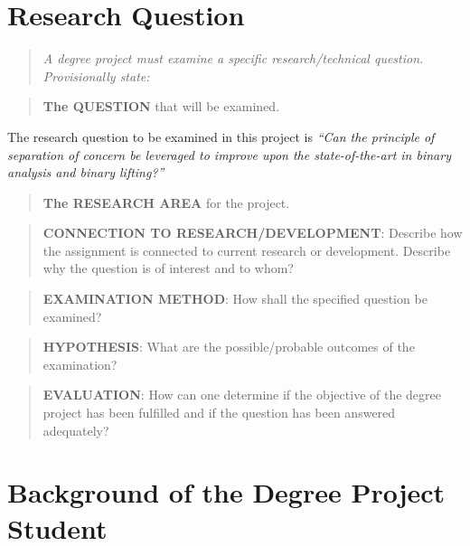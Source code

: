 \documentclass[12pt, a4paper]{article}
\begin{document}
\section{Research Question}

\begin{quote}
	\textit{A degree project must examine a specific research/technical question. Provisionally state:}
\end{quote}

\begin{quote}
	\textbf{The QUESTION} that will be examined.
\end{quote}

The research question to be examined in this project is \textit{``Can the principle of separation of concern be leveraged to improve upon the state-of-the-art in binary analysis and binary lifting?''}

\begin{quote}
	\textbf{The RESEARCH AREA} for the project.
\end{quote}


\begin{quote}
	\textbf{CONNECTION TO RESEARCH/DEVELOPMENT}: Describe how the assignment is connected to current research or development. Describe why the question is of interest and to whom?
\end{quote}


\begin{quote}
	\textbf{EXAMINATION METHOD}: How shall the specified question be examined?
\end{quote}


\begin{quote}
	\textbf{HYPOTHESIS}: What are the possible/probable outcomes of the examination?
\end{quote}


\begin{quote}
	\textbf{EVALUATION}: How can one determine if the objective of the degree project has been fulfilled and if the question has been answered adequately?
\end{quote}


\section{Background of the Degree Project Student}
\end{document}
